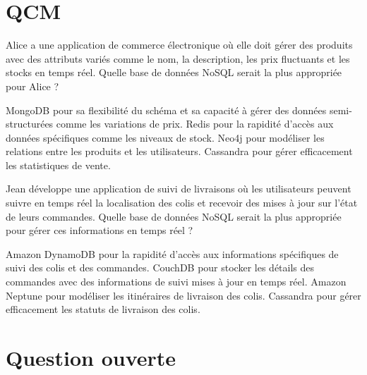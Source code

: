 	\begin{questions}
		
		\section*{QCM}
		
				
		\question[1] Alice a une application de commerce électronique où elle doit gérer des produits avec des attributs variés comme le nom, la description, les prix fluctuants et les stocks en temps réel. Quelle base de données NoSQL serait la plus appropriée pour Alice ?
		\begin{checkboxes}
			\CorrectChoice MongoDB pour sa flexibilité du schéma et sa capacité à gérer des données semi-structurées comme les variations de prix.
			\choice Redis pour la rapidité d'accès aux données spécifiques comme les niveaux de stock.
			\choice Neo4j pour modéliser les relations entre les produits et les utilisateurs.
			\choice Cassandra pour gérer efficacement les statistiques de vente.
		\end{checkboxes}
		
		\question[1] Jean développe une application de suivi de livraisons où les utilisateurs peuvent suivre en temps réel la localisation des colis et recevoir des mises à jour sur l'état de leurs commandes. Quelle base de données NoSQL serait la plus appropriée pour gérer ces informations en temps réel ?
		\begin{checkboxes}
			\CorrectChoice Amazon DynamoDB pour la rapidité d'accès aux informations spécifiques de suivi des colis et des commandes.
			\choice CouchDB pour stocker les détails des commandes avec des informations de suivi mises à jour en temps réel.
			\choice Amazon Neptune pour modéliser les itinéraires de livraison des colis.
			\choice Cassandra pour gérer efficacement les statuts de livraison des colis.
		\end{checkboxes}
		\section*{Question ouverte}
		
	\end{questions}
	

